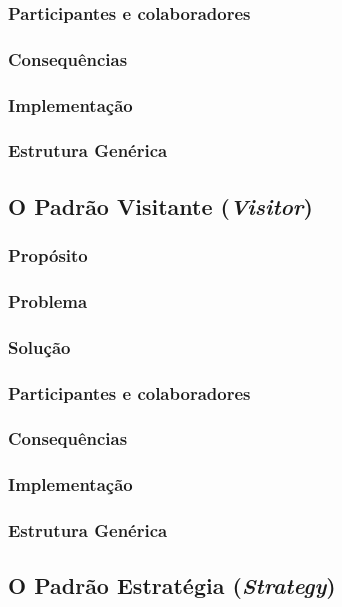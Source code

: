 \documentclass[
	11pt,				%
	openright,
	twoside,			%
	a4paper,			%
	english,			%
	french,
	brazil,				%
	sumario=tradicional
	]{abntex2}
\begin{document}
\subsubsection{Participantes e colaboradores}
\subsubsection{Consequências}
\subsubsection{Implementação}
\subsubsection{Estrutura Genérica}

\subsection{O Padrão Visitante (\textit{Visitor})}
\subsubsection{Propósito}
\subsubsection{Problema}
\subsubsection{Solução}
\subsubsection{Participantes e colaboradores}
\subsubsection{Consequências}
\subsubsection{Implementação}
\subsubsection{Estrutura Genérica}

\subsection{O Padrão Estratégia (\textit{Strategy})}
\end{document}
